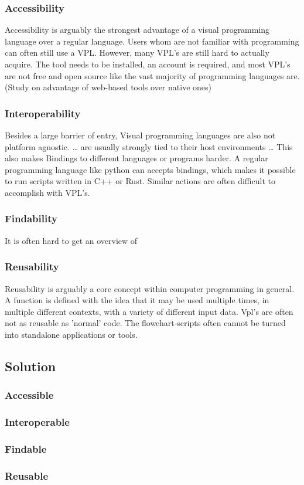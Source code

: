 \subsubsection*{Accessibility}
Accessibility is arguably the strongest advantage of a visual programming language over a regular language. 
Users whom are not familiar with programming can often still use a VPL. 
However, many VPL's are still hard to actually acquire. 
The tool needs to be installed, an account is required, and most VPL's are not free and open source like the vast majority of programming languages are. (Study on advantage of web-based tools over native ones)

\subsubsection*{Interoperability}
Besides a large barrier of entry, Visual programming languages are also not platform agnostic. 
\dots
are usually strongly tied to their host environments
\dots
This also makes Bindings to different languages or programs harder. A regular programming language like python can accepts bindings, which makes it possible to run scripts written in C++ or Rust. Similar actions are often difficult to accomplish with VPL's.

\subsubsection*{Findability}
It is often hard to get an overview of 


\subsubsection*{Reusability}
Reusability is arguably a core concept within computer programming in general. 
A function is defined with the idea that it may be used multiple times, in multiple different contexts, with a variety of different input data.
Vpl's are often not as reusable as 'normal' code. The flowchart-scripts often cannot be turned into standalone applications or tools.



\newpage
\subsection{Solution}


\subsubsection*{Accessible}


\subsubsection*{Interoperable}



\subsubsection*{Findable}


\subsubsection*{Reusable}


